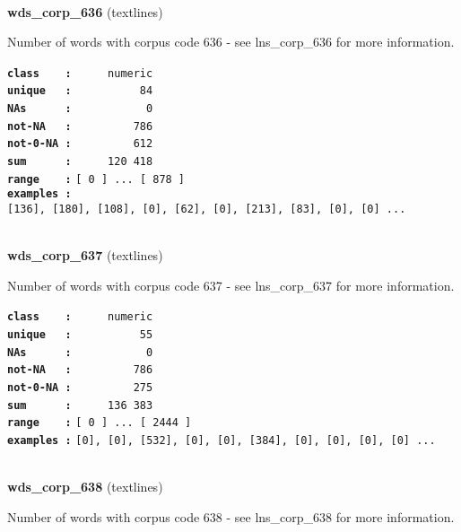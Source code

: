 \documentclass[]{article}
\begin{document}
~

\textbf{wds\_corp\_636} (textlines)

Number of words with corpus code 636 - see lns\_corp\_636 for more
information.

\textbf{\texttt{class\ \ \ \ :}} \texttt{~~~~~numeric}\\
\textbf{\texttt{unique\ \ \ :}} \texttt{~~~~~~~~~~84}\\
\textbf{\texttt{NAs\ \ \ \ \ \ :}} \texttt{~~~~~~~~~~~0}\\
\textbf{\texttt{not-NA\ \ \ :}} \texttt{~~~~~~~~~786}\\
\textbf{\texttt{not-0-NA\ :}} \texttt{~~~~~~~~~612}\\
\textbf{\texttt{sum\ \ \ \ \ \ :}} \texttt{~~~~~120~418}\\
\textbf{\texttt{range\ \ \ \ :}}
\texttt{{[}\ 0\ {]}\ ...\ {[}\ 878\ {]}}\\
\textbf{\texttt{examples\ :}}
\texttt{{[}136{]},\ {[}180{]},\ {[}108{]},\ {[}0{]},\ {[}62{]},\ {[}0{]},\ {[}213{]},\ {[}83{]},\ {[}0{]},\ {[}0{]}\ ...}\\

~

\textbf{wds\_corp\_637} (textlines)

Number of words with corpus code 637 - see lns\_corp\_637 for more
information.

\textbf{\texttt{class\ \ \ \ :}} \texttt{~~~~~numeric}\\
\textbf{\texttt{unique\ \ \ :}} \texttt{~~~~~~~~~~55}\\
\textbf{\texttt{NAs\ \ \ \ \ \ :}} \texttt{~~~~~~~~~~~0}\\
\textbf{\texttt{not-NA\ \ \ :}} \texttt{~~~~~~~~~786}\\
\textbf{\texttt{not-0-NA\ :}} \texttt{~~~~~~~~~275}\\
\textbf{\texttt{sum\ \ \ \ \ \ :}} \texttt{~~~~~136~383}\\
\textbf{\texttt{range\ \ \ \ :}}
\texttt{{[}\ 0\ {]}\ ...\ {[}\ 2444\ {]}}\\
\textbf{\texttt{examples\ :}}
\texttt{{[}0{]},\ {[}0{]},\ {[}532{]},\ {[}0{]},\ {[}0{]},\ {[}384{]},\ {[}0{]},\ {[}0{]},\ {[}0{]},\ {[}0{]}\ ...}\\

~

\textbf{wds\_corp\_638} (textlines)

Number of words with corpus code 638 - see lns\_corp\_638 for more
information.
\end{document}
